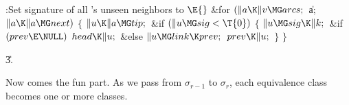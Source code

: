 \B{}:Set signature of all 's unseen neighbors
to \X${}\E{}$\6
\&{for} ${}(\|a\K\|v\MG\\{arcs};{}$ \|a; ${}\|a\K\|a\MG\\{next}){}$\5
${}\{{}$\1\6
${}\|u\K\|a\MG\\{tip};{}$\6
\&{if} ${}(\|u\MG\\{sig}<\T{0}){}$\5
${}\{{}$\1\6
${}\|u\MG\\{sig}\K\|k;{}$\6
\&{if} ${}(\\{prev}\E\NULL){}$\1\5
${}\\{head}\K\|u;{}$\2\6
\&{else}\1\5
${}\|u\MG\\{link}\K\\{prev};{}$\2\6
${}\\{prev}\K\|u;{}$\6
\4${}\}{}$\2\6
\4${}\}{}$\2\par
\U3.\fi

Now comes the fun part. As we pass from $\sigma_{r-1}$
to $\sigma_r$,
each equivalence class becomes one or more classes.

